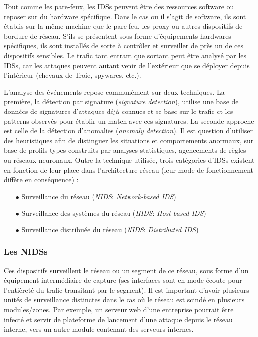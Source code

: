 \documentclass[]{article}
\begin{document}
\par Tout comme les pare-feux, les IDSs peuvent être des ressources software ou reposer sur du hardware spécifique. Dans le cas ou il s'agit de software, ils sont établis sur la même machine que le pare-feu, les proxy ou autres dispositifs de bordure de réseau. S'ils se présentent sous forme d'équipements hardwares spécifiques, ils sont installés de sorte à contrôler et surveiller de près un de ces dispositifs sensibles. Le trafic tant entrant que sortant peut être analysé par les IDSs, car les attaques peuvent autant venir de l'extérieur que se déployer depuis l'intérieur (chevaux de Troie, spywares, etc.).\\

\par L'analyse des événements repose communément sur deux techniques. La première, la détection par signature (\textit{signature detection}), utilise une base de données de signatures d'attaques déjà connues et se base sur le trafic et les patterns observés pour établir un match avec ces signatures. La seconde approche est celle de la détection d'anomalies (\textit{anomaly detection}). Il est question d'utiliser des heuristiques afin de distinguer les situations et comportements anormaux, sur base de profils types construits par analyses statistiques, agencements de règles ou réseaux neuronaux. Outre la technique utilisée, trois catégories d'IDSs existent en fonction de leur place dans l'architecture réseau (leur mode de fonctionnement diffère en conséquence) :
\vspace{0.3cm}
\begin{itemize}
\item[$\bullet$] Surveillance du réseau (\textit{NIDS}:\textit{ Network-based IDS})
\item[$\bullet$] Surveillance des systèmes du réseau (\textit{HIDS}:\textit{ Host-based IDS}) 
\item[$\bullet$] Surveillance distribuée du réseau (\textit{NIDS}:\textit{ Distributed IDS}) 
\end{itemize} 

\subsubsection{Les NIDSs}

\par Ces dispositifs surveillent le réseau ou un segment de ce réseau, sous forme d'un équipement intermédiaire de capture (ses interfaces sont en mode écoute pour l'entièreté du trafic transitant par le segment). Il est important d'avoir plusieurs unités de surveillance distinctes dans le cas où le réseau est scindé en plusieurs modules/zones. Par exemple, un serveur web d'une entreprise pourrait être infecté et servir de plateforme de lancement d'une attaque depuis le réseau interne, vers un autre module contenant des serveurs internes.\\
\end{document}
